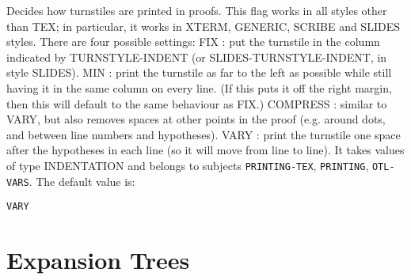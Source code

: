 \begin{description}
\item[TURNSTYLE-INDENT-AUTO]  
Decides how turnstiles are printed in proofs. This flag works in
all styles other than TEX; in particular, it works in XTERM, GENERIC, 
SCRIBE and SLIDES styles. There are four possible settings:
FIX : put the turnstile in the column indicated by TURNSTYLE-INDENT 
      (or SLIDES-TURNSTYLE-INDENT, in style SLIDES).
MIN : print the turnstile as far to the left as possible while still having
      it in the same column on every line. (If this puts it off the right 
      margin, then this will default to the same behaviour as FIX.)
COMPRESS : similar to VARY, but also removes spaces at other points in the
           proof (e.g. around dots, and between line numbers and hypotheses).
VARY : print the turnstile one space after the hypotheses in each line
       (so it will move from line to line).
It takes values of type INDENTATION and belongs to subjects \texttt{PRINTING-TEX}, \texttt{PRINTING}, \texttt{OTL-VARS}.  The default value is: \begin{lstlisting}
VARY
\end{lstlisting}

\item
\end{description}

\section{Expansion Trees}

